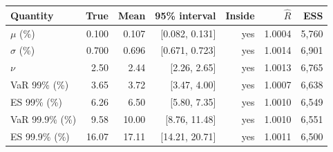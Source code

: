 \begin{tabular}{lrrrrrr}
\toprule
Quantity & True & Mean & 95\% interval & Inside & $\hat R$ & ESS \\
\midrule
$\mu$ (\%) & 0.100 & 0.107 & [0.082, 0.131] & yes & 1.0004 & 5,760 \\
$\sigma$ (\%) & 0.700 & 0.696 & [0.671, 0.723] & yes & 1.0014 & 6,901 \\
$\nu$ & 2.50 & 2.44 & [2.26, 2.65] & yes & 1.0013 & 6,765 \\
VaR 99\% (\%) & 3.65 & 3.72 & [3.47, 4.00] & yes & 1.0007 & 6,638 \\
ES 99\% (\%) & 6.26 & 6.50 & [5.80, 7.35] & yes & 1.0010 & 6,549 \\
VaR 99.9\% (\%) & 9.58 & 10.00 & [8.76, 11.48] & yes & 1.0010 & 6,551 \\
ES 99.9\% (\%) & 16.07 & 17.11 & [14.21, 20.71] & yes & 1.0011 & 6,500 \\
\bottomrule
\end{tabular}
